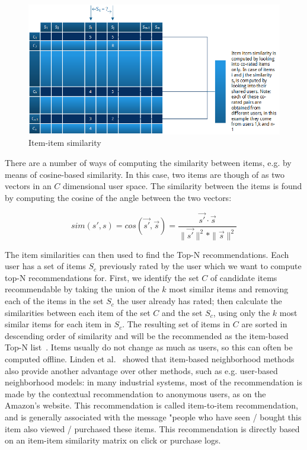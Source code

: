 \begin{figure}[H]
    \includegraphics[width=5in]{image/itemsim.png}
    \centering
    \caption[Item-item similarity]{Item-item similarity}
    \label{figure:itemsim}
\end{figure}

There are a number of ways of computing the similarity between items, e.g. by
means of cosine-based similarity. In this case, two items are though of as two
vectors in an $C$ dimensional user space. The similarity between the items is
found by computing the cosine of the angle between the two vectors:

\begin{equation}
sim(s',s) = cos(\vec{s'},\vec{s}) = \frac{\vec{s'} \cdot \vec{s}}{\|\vec{s'}\|^{2} * \|\vec{s}\|^{2}}
\end{equation}

The item similarities can then used to find the Top-N recommendations. Each
user has a set of items $S_{c}$ previously rated by the user which we want to
compute top-N recommendations for. First, we identify the set $C$ of candidate
items recommendable by taking the union of the $k$ most similar items and
removing each of the items in the set $S_{c}$ the user already has rated; then
calculate the similarities between each item of the set $C$ and the set
$S_{c}$, using only the $k$ most similar items for each item in $S_{c}$. The
resulting set of items in $C$ are sorted in descending order of similarity and
will be the recommended as the item-based Top-N list~\cite{Karypis2001}.
Items usually do not change as much as users, so this can often be computed offline.
Linden et al.~\cite{Linden2003} showed that item-based neighborhood methods also provide
another advantage over other methods, such as e.g. user-based neighborhood models:
in many industrial systems, most of the recommendation is made by the contextual
recommendation to anonymous users, as on the Amazon's website. This
recommendation is called item-to-item recommendation, and is generally associated
with the message "people who have seen / bought this item also viewed / purchased these items.
This recommendation is directly based on an item-item similarity matrix on click or
purchase logs.

